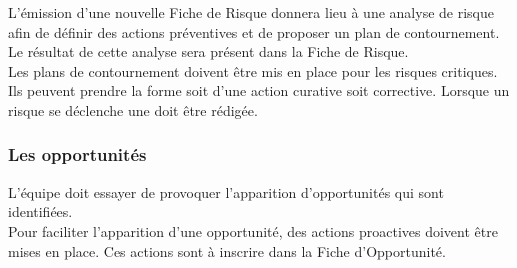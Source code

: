 L'émission d'une nouvelle Fiche de Risque donnera lieu à une analyse de risque afin de définir des actions préventives et de proposer un plan de contournement. Le résultat de cette analyse sera présent dans la Fiche de Risque. \\

Les plans de contournement doivent être mis en place pour les risques critiques. Ils peuvent prendre la forme soit d’une action curative soit corrective. Lorsque un risque se déclenche une \FFT{} doit être rédigée. \\ 

\subsubsection*{Les opportunités}

L'équipe \PICCourt doit essayer de provoquer l’apparition d'opportunités qui sont identifiées. \\ 

Pour faciliter l'apparition d'une opportunité, des actions proactives doivent être mises en place. Ces actions sont à inscrire dans la Fiche d'Opportunité.

